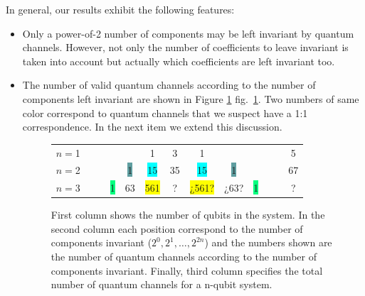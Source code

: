 \documentclass[11pt,dvipsnames]{article} %
\newcommand{\fref}[1]{fig.~\ref{#1}}  \newcommand{\tref}[1]{table~\ref{#1}}
\begin{document}
In general, our results exhibit the following features:
\begin{itemize}
\item Only a power-of-2 number of components may be left invariant by quantum
channels. However, not only the number of coefficients to leave invariant is
taken into account but actually which coefficients are left invariant too.

\item 
The number of valid quantum channels according to the number of components
left invariant are shown in Figure \ref{fig:CCs-by-components} \fref{fig:CCs-by-components}. Two numbers
of same color correspond to quantum channels that we suspect have a 1:1 
correspondence. In the next item we extend this discussion.

\begin{figure}[H]%
	\centering
	\begin{tabular}{>{$n=$}l<{\hfill}*{12}{c}}
1 &&&&&\colorbox{Apricot}{1}&3&\colorbox{Apricot}{1}&&&&&5\\
2 &&&&\colorbox{CadetBlue}{1}&\colorbox{Cyan}{15}&35&\colorbox{Cyan}{15}&\colorbox{CadetBlue}{1}&&&&67\\
3 &&&\colorbox{SpringGreen}{1}&\colorbox{RedOrange}{63}&\colorbox{Yellow}{561}&?&\colorbox{Yellow}{¿561?}&
\colorbox{RedOrange}{¿63?}&\colorbox{SpringGreen}{1}&&&?
\end{tabular}
\caption{First column shows the number of qubits in the system.  In the second
column each position correspond to the number of components invariant ($2^0,
2^1, \ldots, 2^{2n}$) and the numbers shown are the number of quantum channels
according to the number of components invariant.  Finally, third column
specifies the total number of quantum channels for a n-qubit   system.}
\label{fig:CCs-by-components}
\end{figure} %


\end{itemize}
\end{document}
